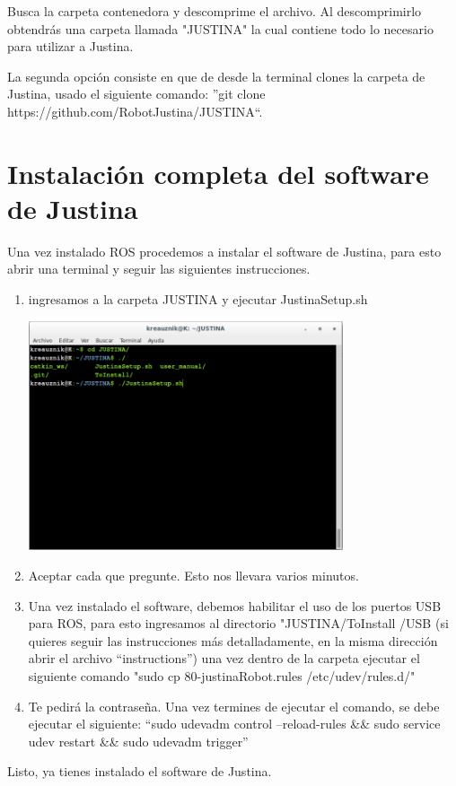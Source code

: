 \documentclass[user_manual.tex]{subfiles}
\begin{document}
 Busca la carpeta contenedora y descomprime el archivo. Al descomprimirlo obtendrás una carpeta llamada "JUSTINA" la 
 cual contiene todo lo necesario para utilizar a Justina.
 
 La segunda opción consiste  en que de desde la terminal clones la carpeta de Justina, usado el siguiente comando: ''git clone https://github.com/RobotJustina/JUSTINA``.
 
\section{Instalación completa del software de Justina}
Una vez instalado ROS procedemos a instalar el software de Justina, para esto abrir una terminal y seguir las siguientes instrucciones.

\begin{enumerate}
 \item ingresamos a la carpeta JUSTINA y ejecutar JustinaSetup.sh
  \begin{center}
\includegraphics[width=0.73\textwidth]{Figures/PP/pp4.png}
\end{center}
 \item Aceptar cada que pregunte. Esto nos llevara varios minutos.
 \item Una vez instalado el software, debemos habilitar el uso de los puertos USB para ROS, para esto ingresamos al directorio "JUSTINA/ToInstall
 /USB (si quieres seguir las instrucciones más detalladamente, en la misma dirección abrir el archivo ``instructions'') una vez dentro
 de la carpeta ejecutar el siguiente comando "sudo cp 80-justinaRobot.rules /etc/udev/rules.d/"
 \item Te pedirá la contraseña. Una vez termines de ejecutar el comando, se debe ejecutar el siguiente: ``sudo udevadm control --reload-rules \&\& sudo service udev restart \&\& sudo udevadm trigger''
\end{enumerate}
Listo, ya tienes instalado el software de Justina.
\end{document}
